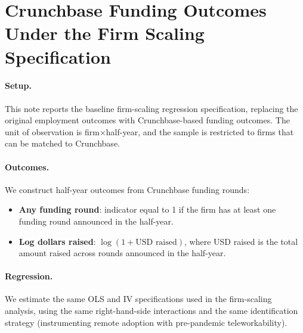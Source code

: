 \documentclass{article}
\newcommand{\cleanedresultsdir}{../results/cleaned/tex}
\begin{document}
\thispagestyle{empty}

\section*{Crunchbase Funding Outcomes Under the Firm Scaling Specification}

\paragraph{Setup.}
This note reports the baseline firm-scaling regression specification, replacing the original employment outcomes with Crunchbase-based funding outcomes.
The unit of observation is firm$\times$half-year, and the sample is restricted to firms that can be matched to Crunchbase.

\paragraph{Outcomes.}
We construct half-year outcomes from Crunchbase funding rounds:
\begin{itemize}
  \item \textbf{Any funding round}: indicator equal to 1 if the firm has at least one funding round announced in the half-year.
  \item \textbf{Log dollars raised}: $\log(1 + \text{USD raised})$, where USD raised is the total amount raised across rounds announced in the half-year.
\end{itemize}

\paragraph{Regression.}
We estimate the same OLS and IV specifications used in the firm-scaling analysis, using the same right-hand-side interactions and the same identification strategy (instrumenting remote adoption with pre-pandemic teleworkability).

\begin{table}[h!]
\caption{\textbf{Firm Scaling Spec with Crunchbase Funding Outcomes}}

\end{table}
\end{document}
